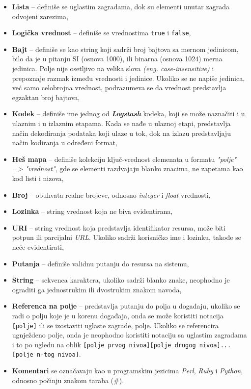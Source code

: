 \begin{itemize}
    \item \textbf{Lista} – definiše se uglastim zagradama, dok su elementi unutar zagrada odvojeni zarezima,
    \item \textbf{Logička vrednost} – definiše se vrednostima \texttt{true} i \texttt{false},
    \item \textbf{Bajt} – definiše se kao string koji sadrži broj bajtova sa mernom jedinicom, bilo da je u pitanju SI (osnova 1000), ili binarna (osnova 1024) merna jedinica. Polje nije osetljivo na velika slova \textit{(eng. case-insensitive)} i prepoznaje razmak između vrednosti i jedinice. Ukoliko se ne napiše jedinica, već samo celobrojna vrednost, podrazumeva se da vrednost predstavlja egzaktan broj bajtova,
    \item \textbf{Kodek} – definiše ime jednog od \textit{\textbf{Logstash}} kodeka, koji se može naznačiti i u ulaznim i u izlaznim etapama. Kada se nađe u ulaznoj etapi, predstavlja način dekodiranja podataka koji ulaze u tok, dok na izlazu predstavljaju način kodiranja u određeni format,
    \item \textbf{Heš mapa} – definiše kolekciju ključ-vrednost elemenata u formatu \textit{"polje" => "vrednost"}, gde se elementi razdvajaju blanko znacima, ne zapetama kao kod listi i nizova,
    \item \textbf{Broj} – obuhvata realne brojeve, odnosno \textit{integer} i \textit{float} vrednosti,
    \item \textbf{Lozinka} – string vrednost koja ne biva evidentirana,
    \item \textbf{URI} – string vrednost koja predstavlja identifikator resursa, može biti potpun ili parcijalni \textit{URL}. Ukoliko sadrži korisničko ime i lozinku, takođe se neće evidentirati,
    \item \textbf{Putanja} – definiše validnu putanju do resursa na sistemu,
    \item \textbf{String} – sekvenca karaktera, ukoliko sadrži blanko znake, neophodno je ograditi ga jednostrukim ili dvostrukim znakom navoda,
    \item \textbf{Referenca na polje} – predstavlja putanju do polja u događaju, ukoliko se radi o polju koje je u korenu događaja, onda se može koristiti notacija \texttt{[polje]} ili se izostaviti uglaste zagrade, polje. Ukoliko se referencira ugnježdeno polje, onda je neophodno koristiti notaciju sa uglastim zagradama i to po ugledu na oblik \texttt{[polje prvog nivoa][polje drugog nivoa]...[polje n-tog nivoa]}.
    \item \textbf{Komentari} se označavaju kao u programskim jezicima \textit{Perl}, \textit{Ruby} i \textit{Python}, odnosno počinju znakom taraba (\#).
\end{itemize}


